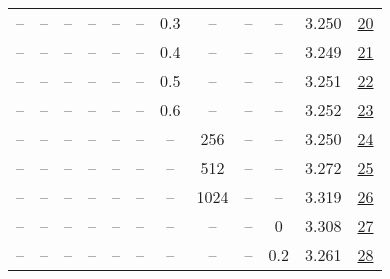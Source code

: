 \begin{table}[H]
\begin{tabular}{cccccccccccc}
-- & -- & -- & -- & -- & -- & 0.3 & -- & -- & -- & 3.250 & \href{https://wandb.ai/stanford-mercury/optimizer-scaling/runs/sweep-130m-21B-scion2c2f99lr0.008-wd0.1-minlr0-warmup0-b10.98-gn-297c7d}{20} \\
-- & -- & -- & -- & -- & -- & 0.4 & -- & -- & -- & 3.249 & \href{https://wandb.ai/stanford-mercury/optimizer-scaling/runs/sweep-130m-21B-scion6d330dlr0.008-wd0.1-minlr0-warmup0-b10.98-gn-ee71b4}{21} \\
-- & -- & -- & -- & -- & -- & 0.5 & -- & -- & -- & 3.251 & \href{https://wandb.ai/stanford-mercury/optimizer-scaling/runs/sweep-130m-21B-scion135c27lr0.008-wd0.1-minlr0-warmup0-b10.98-gn-e8fbd7}{22} \\
-- & -- & -- & -- & -- & -- & 0.6 & -- & -- & -- & 3.252 & \href{https://wandb.ai/stanford-mercury/optimizer-scaling/runs/sweep-130m-21B-scion1fa022lr0.008-wd0.1-minlr0-warmup0-b10.98-gn-bc1b5f}{23} \\
-- & -- & -- & -- & -- & -- & -- & 256 & -- & -- & 3.250 & \href{https://wandb.ai/stanford-mercury/optimizer-scaling/runs/sweep-130m-21B-scion8d67e8lr0.008-wd0.1-minlr0-warmup0-b10.98-gn-fab0cb}{24} \\
-- & -- & -- & -- & -- & -- & -- & 512 & -- & -- & 3.272 & \href{https://wandb.ai/stanford-mercury/optimizer-scaling/runs/sweep-130m-21B-scion1842ealr0.008-wd0.1-minlr0-warmup0-b10.98-gn-7b77d6}{25} \\
-- & -- & -- & -- & -- & -- & -- & 1024 & -- & -- & 3.319 & \href{https://wandb.ai/stanford-mercury/optimizer-scaling/runs/sweep-130m-21B-sciono9fdb98lr0.008-wd0.1-minlr0-warmup0-b10.98-g-5de496}{26} \\
-- & -- & -- & -- & -- & -- & -- & -- & -- & 0 & 3.308 & \href{https://wandb.ai/stanford-mercury/optimizer-scaling/runs/sweep-130m-21B-scionbc1373elr0.008-wd0-minlr0-warmup0-b10.98-gn2-5e6a7c}{27} \\
-- & -- & -- & -- & -- & -- & -- & -- & -- & 0.2 & 3.261 & \href{https://wandb.ai/stanford-mercury/optimizer-scaling/runs/sweep-130m-21B-scion898306lr0.008-wd0.2-minlr0-warmup0-b10.98-gn-a11a2b}{28} \\
\bottomrule
\end{tabular}
\end{table}

